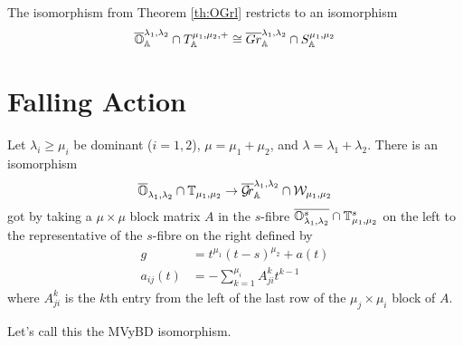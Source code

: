 \documentclass[draft]{article}
\begin{document}
\begin{theorem}
    The isomorphism from Theorem \ref{th:OGrl} restricts to an isomorphism
    $$ \overline{\mathbb O}^{\lambda_1, \lambda_2}_\mathbb A \cap T^{\mu_1, \mu_2, +}_\mathbb A \cong \overline{Gr}^{\lambda_1, \lambda_2}_\mathbb A \cap S^{\mu_1, \mu_2}_\mathbb A$$
\end{theorem}


\section{Falling Action} %

\begin{theorem}
    Let $\lambda_i\ge\mu_i$ be dominant ($i=1,2$), $\mu = \mu_1 +\mu_2$, and $\lambda =\lambda_1+\lambda_2$. 
    There is an isomorphism 
    \begin{equation}
        \overline{\mathbb O}_{\lambda_1,\lambda_2}\cap\mathbb T_{\mu_1,\mu_2} \to \overline{\mathcal{G}\!r}_\mathbb A^{\lambda_1,\lambda_2}\cap \mathcal W_{\mu_1,\mu_2}
    \end{equation}
    got by taking a $\mu\times\mu$ block matrix $A$ in the $s$-fibre $\overline{\mathbb O_{\lambda_1,\lambda_2}^s}\cap\mathbb T_{\mu_1,\mu_2}^s$ on the left to the representative of the $s$-fibre on the right defined by  
    \begin{equation}
        \begin{split}
            g &= t^{\mu_1} (t-s)^{\mu_2} + a(t) \\
            a_{ij}(t) &= - \sum_{k=1}^{\mu_i} A^k_{ji} t^{k-1}
        \end{split}
    \end{equation}
    where $A^k_{ji}$ is the $k$th entry from the left of the last row of the $\mu_j\times\mu_i$ block of $A$. 
\end{theorem}

Let's call this the MVyBD isomorphism.
\end{document}
